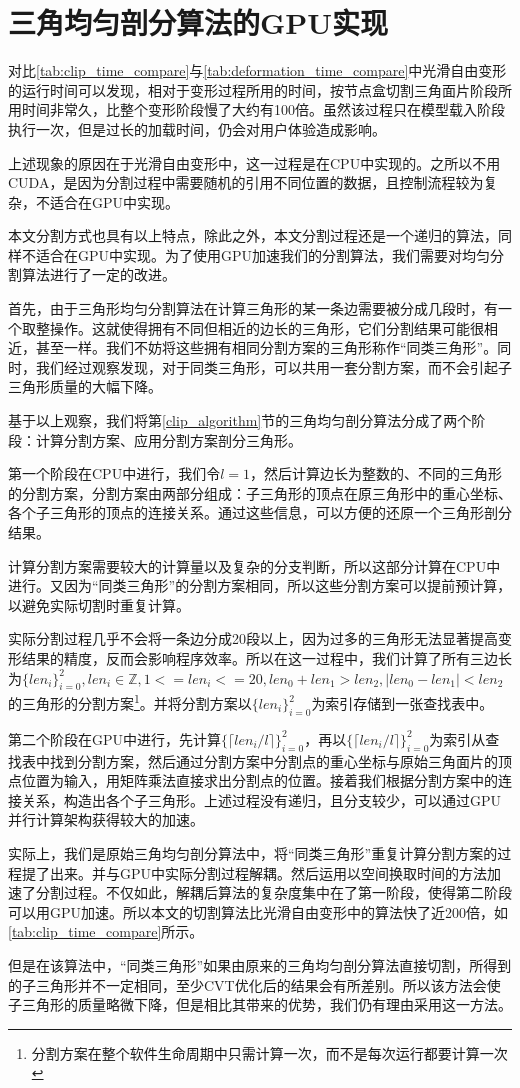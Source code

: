 \section{三角均匀剖分算法的GPU实现}
    对比\autoref{tab:clip_time_compare}与\autoref{tab:deformation_time_compare}中光滑自由变形的运行时间可以发现，相对于变形过程所用的时间，按节点盒切割三角面片阶段所用时间非常久，比整个变形阶段慢了大约有100倍。虽然该过程只在模型载入阶段执行一次，但是过长的加载时间，仍会对用户体验造成影响。

    上述现象的原因在于光滑自由变形中，这一过程是在CPU中实现的。之所以不用CUDA，是因为分割过程中需要随机的引用不同位置的数据，且控制流程较为复杂，不适合在GPU中实现。

    本文分割方式也具有以上特点，除此之外，本文分割过程还是一个递归的算法，同样不适合在GPU中实现。为了使用GPU加速我们的分割算法，我们需要对均匀分割算法进行了一定的改进。

    首先，由于三角形均匀分割算法在计算三角形的某一条边需要被分成几段时，有一个取整操作。这就使得拥有不同但相近的边长的三角形，它们分割结果可能很相近，甚至一样。我们不妨将这些拥有相同分割方案的三角形称作“同类三角形”。同时，我们经过观察发现，对于同类三角形，可以共用一套分割方案，而不会引起子三角形质量的大幅下降。

    基于以上观察，我们将第\autoref{clip_algorithm}节的三角均匀剖分算法分成了两个阶段：计算分割方案、应用分割方案剖分三角形。


    第一个阶段在CPU中进行，我们令$l=1$，然后计算边长为整数的、不同的三角形的分割方案，分割方案由两部分组成：子三角形的顶点在原三角形中的重心坐标、各个子三角形的顶点的连接关系。通过这些信息，可以方便的还原一个三角形剖分结果。

    计算分割方案需要较大的计算量以及复杂的分支判断，所以这部分计算在CPU中进行。又因为“同类三角形”的分割方案相同，所以这些分割方案可以提前预计算，以避免实际切割时重复计算。

    实际分割过程几乎不会将一条边分成20段以上，因为过多的三角形无法显著提高变形结果的精度，反而会影响程序效率。所以在这一过程中，我们计算了所有三边长为$\{len_i\}^{2}_{i=0}, len_i \in \mathbb{Z}, 1 <= len_i <= 20, len_0 + len_1 > len_2, |len_0 - len_1| < len_2$的三角形的分割方案\footnote{分割方案在整个软件生命周期中只需计算一次，而不是每次运行都要计算一次}。并将分割方案以$\{len_i\}^{2}_{i=0}$为索引存储到一张查找表中。


    第二个阶段在GPU中进行，先计算$\{\lceil len_i/l \rceil\}^{2}_{i=0}$，再以$\{\lceil len_i/l \rceil\}^{2}_{i=0}$为索引从查找表中找到分割方案，然后通过分割方案中分割点的重心坐标与原始三角面片的顶点位置为输入，用矩阵乘法直接求出分割点的位置。接着我们根据分割方案中的连接关系，构造出各个子三角形。上述过程没有递归，且分支较少，可以通过GPU并行计算架构获得较大的加速。

    实际上，我们是原始三角均匀剖分算法中，将“同类三角形”重复计算分割方案的过程提了出来。并与GPU中实际分割过程解耦。然后运用以空间换取时间的方法加速了分割过程。不仅如此，解耦后算法的复杂度集中在了第一阶段，使得第二阶段可以用GPU加速。所以本文的切割算法比光滑自由变形中的算法快了近200倍，如\autoref{tab:clip_time_compare}所示。

    但是在该算法中，“同类三角形”如果由原来的三角均匀剖分算法直接切割，所得到的子三角形并不一定相同，至少CVT优化后的结果会有所差别。所以该方法会使子三角形的质量略微下降，但是相比其带来的优势，我们仍有理由采用这一方法。
